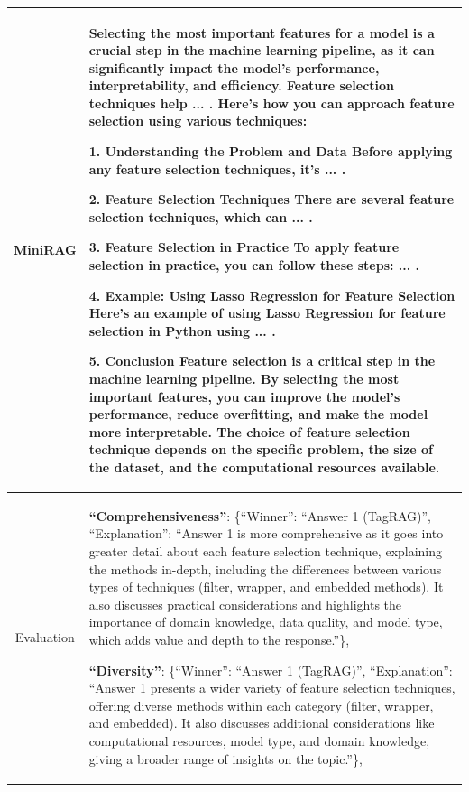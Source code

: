 \documentclass[11pt]{article}
\begin{document}
\begin{table}[h]
\begin{tabularx}{\textwidth}{p{2cm}|X}
    \hline
    
    \multicolumn{1}{c|}{MiniRAG} &  Selecting the most important features for a model is a crucial step in the machine learning pipeline, as it can significantly impact the model's performance, interpretability, and efficiency. Feature selection techniques help ... . Here's how you can approach feature selection using various techniques:

    1. \textbf{Understanding the Problem and Data}
    Before applying any feature selection techniques, it's  ... .
    
    2. \textbf{Feature Selection Techniques}
    There are several feature selection techniques, which can ... .
    
    3. \textbf{Feature Selection in Practice}
    To apply feature selection in practice, you can follow these steps: ... .
    
    4. \textbf{Example: Using Lasso Regression for Feature Selection}
    Here's an example of using Lasso Regression for feature selection in Python using ... .
    
    5. \textbf{Conclusion}
    Feature selection is a critical step in the machine learning pipeline. By selecting the most important features, you can improve the model's performance, reduce overfitting, and make the model more interpretable. The choice of feature selection technique depends on the specific problem, the size of the dataset, and the computational resources available. \\ 
    
    \hline
    
    \multicolumn{1}{c|}{Evaluation} & \textbf{``Comprehensiveness''}: \{``Winner'': ``Answer 1 (TagRAG)'', ``Explanation'': ``Answer 1 is more comprehensive as it goes into greater detail about each feature selection technique, explaining the methods in-depth, including the differences between various types of techniques (filter, wrapper, and embedded methods). It also discusses practical considerations and highlights the importance of domain knowledge, data quality, and model type, which adds value and depth to the response.''\},
    
    \textbf{``Diversity''}: \{``Winner'': ``Answer 1 (TagRAG)'', ``Explanation'': ``Answer 1 presents a wider variety of feature selection techniques, offering diverse methods within each category (filter, wrapper, and embedded). It also discusses additional considerations like computational resources, model type, and domain knowledge, giving a broader range of insights on the topic.''\},
    

\end{tabularx}
\end{table}
\end{document}
